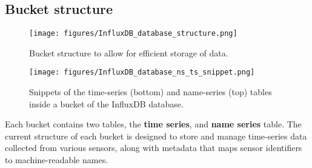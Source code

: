 \documentclass{article}
\begin{document}
\subsection{Bucket structure}
\begin{figure} [h]
\centering
\texttt{[image: figures/InfluxDB\_database\_structure.png]}
\caption{\label{fig:InfluxDBstructure}Bucket structure to allow for efficient storage of data.}
\end{figure}

\begin{figure} [h]
\centering
\texttt{[image: figures/InfluxDB\_database\_ns\_ts\_snippet.png]}
\caption{\label{fig:InfluxDBtablesnippet}Snippets of the time-series (bottom) and name-series (top) tables inside a bucket of the InfluxDB database.}
\end{figure}

\noindent
Each bucket contains two tables, the \textbf{time series}, and \textbf{name series} table. The current structure of each bucket is designed to store and manage time-series data collected from various sensors, along with metadata that maps sensor identifiers to machine-readable names.
\end{document}
